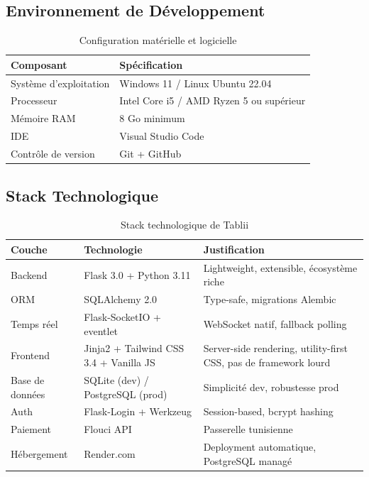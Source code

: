 \documentclass[12pt,a4paper]{report}
\begin{document}
\subsection{Environnement de Développement}

\begin{table}[H]
    \centering
    \begin{tabularx}{\textwidth}{l X}
        \toprule
        \rowcolor{primary!10}
        \textbf{Composant} & \textbf{Spécification} \\
        \midrule
        Système d'exploitation & Windows 11 / Linux Ubuntu 22.04 \\
        Processeur & Intel Core i5 / AMD Ryzen 5 ou supérieur \\
        Mémoire RAM & 8 Go minimum \\
        IDE & Visual Studio Code \\
        Contrôle de version & Git + GitHub \\
        \bottomrule
    \end{tabularx}
    \caption{Configuration matérielle et logicielle}
    \label{tab:env}
\end{table}

\subsection{Stack Technologique}

\begin{table}[H]
    \centering
    \begin{tabularx}{\textwidth}{l l X}
        \toprule
        \rowcolor{primary!10}
        \textbf{Couche} & \textbf{Technologie} & \textbf{Justification} \\
        \midrule
        Backend & Flask 3.0 + Python 3.11 & Lightweight, extensible, écosystème riche \\
        ORM & SQLAlchemy 2.0 & Type-safe, migrations Alembic \\
        Temps réel & Flask-SocketIO + eventlet & WebSocket natif, fallback polling \\
        Frontend & Jinja2 + Tailwind CSS 3.4 + Vanilla JS & Server-side rendering, utility-first CSS, pas de framework lourd \\
        Base de données & SQLite (dev) / PostgreSQL (prod) & Simplicité dev, robustesse prod \\
        Auth & Flask-Login + Werkzeug & Session-based, bcrypt hashing \\
        Paiement & Flouci API & Passerelle tunisienne \\
        Hébergement & Render.com & Deployment automatique, PostgreSQL managé \\
        \bottomrule
    \end{tabularx}
    \caption{Stack technologique de Tablii}
    \label{tab:techstack}
\end{table}
\end{document}
